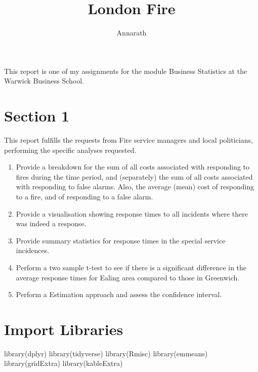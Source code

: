 \documentclass[
]{article}
\title{London Fire}
\author{Annarath}
\date{}
\newenvironment{Shaded}{\begin{snugshade}}{\end{snugshade}}
\newcommand{\FunctionTok}[1]{\textcolor[rgb]{0.00,0.00,0.00}{#1}}
\newcommand{\NormalTok}[1]{#1}
\begin{document}
\maketitle

{
\setcounter{tocdepth}{3}
\tableofcontents
}
This report is one of my assignments for the module Business Statistics
at the Warwick Business School.

\hypertarget{section-1}{%
\section{Section 1}\label{section-1}}

This report fulfills the requests from Fire service managers and local
politicians, performing the specific analyses requested.

\begin{enumerate}
\def\labelenumi{\arabic{enumi}.}
\item
  Provide a breakdown for the sum of all costs associated with
  responding to fires during the time period, and (separately) the sum
  of all costs associated with responding to false alarms. Also, the
  average (mean) cost of responding to a fire, and of responding to a
  false alarm.
\item
  Provide a visualisation showing response times to all incidents where
  there was indeed a response.
\item
  Provide summary statistics for response times in the special service
  incidences.
\item
  Perform a two sample t-test to see if there is a significant
  difference in the average response times for Ealing area compared to
  those in Greenwich.
\item
  Perform a Estimation approach and assess the confidence interval.
\end{enumerate}

\hypertarget{import-libraries}{%
\section{Import Libraries}\label{import-libraries}}

\begin{Shaded}
\begin{Highlighting}[]
\FunctionTok{library}\NormalTok{(dplyr)}
\FunctionTok{library}\NormalTok{(tidyverse)}
\FunctionTok{library}\NormalTok{(Rmisc)}
\FunctionTok{library}\NormalTok{(emmeans)}
\FunctionTok{library}\NormalTok{(gridExtra)}
\FunctionTok{library}\NormalTok{(kableExtra)}
\end{Highlighting}
\end{Shaded}
\end{document}

